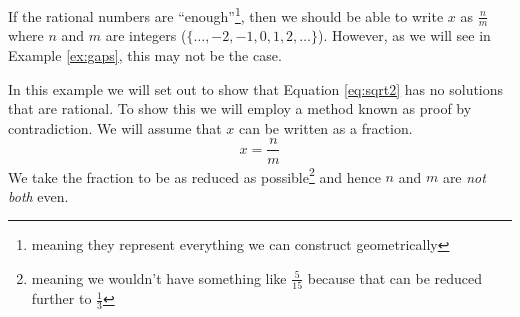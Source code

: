 \documentclass[../../templates/section]{subfiles}
\begin{document}
If the rational numbers are ``enough''\footnote{meaning they represent
everything we can construct geometrically}, then we should be able to write $x$
as $\frac{n}{m}$ where $n$ and $m$ are integers ({$\{\ldots, -2, -1,
0, 1, 2, \ldots\}$}).
However, as we will see in Example \ref{ex:gaps}, this may not be the case.

\begin{example}\label{ex:gaps}
In this example we will set out to show that Equation \ref{eq:sqrt2} has no
solutions that are rational. To show this we will employ a method known as
proof by contradiction. We will assume that $x$ can be written as a fraction.
\begin{equation}\label{eq:sqrt2-is-rational}
    x = \frac{n}{m}
\end{equation}
We take the fraction to be as reduced as possible\footnote{meaning we
wouldn't have something like $\frac{5}{15}$ because that can be reduced further
to $\frac{1}{3}$} and hence $n$ and $m$ are \emph{not both} even.
\end{example}
\end{document}
